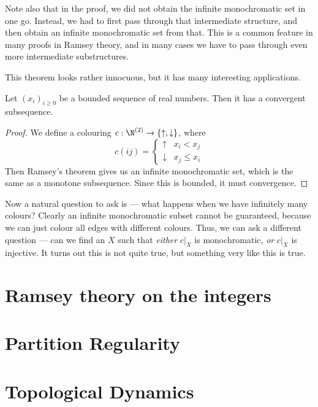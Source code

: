 \documentclass[a4paper]{article}
\begin{document}
Note also that in the proof, we did not obtain the infinite monochromatic set in one go. Instead, we had to first pass through that intermediate structure, and then obtain an infinite monochromatic set from that. This is a common feature in many proofs in Ramsey theory, and in many cases we have to pass through even more intermediate substructures.

This theorem looks rather innocuous, but it has many interesting applications.
\begin{cor}
  Let $(x_i)_{i \geq 0}$ be a bounded sequence of real numbers. Then it has a convergent subsequence.
\end{cor}

\begin{proof}
  We define a colouring $c: \N^{(2)} \to \{\uparrow, \downarrow\}$, where
  \[
    c(ij) =
    \begin{cases}
      \uparrow & x_i < x_j\\
      \downarrow & x_j \leq x_i
    \end{cases}
  \]
  Then Ramsey's theorem gives us an infinite monochromatic set, which is the same as a monotone subsequence. Since this is bounded, it must convergence.
\end{proof}

Now a natural question to ask is --- what happens when we have infinitely many colours? Clearly an infinite monochromatic subset cannot be guaranteed, because we can just colour all edges with different colours. Thus, we can ask a different question --- can we find an $X$ such that \emph{either} $c|_{X}$ is monochromatic, \emph{or} $c|_{X}$ is injective. It turns out this is not quite true, but something very like this is true.

\section{Ramsey theory on the integers}
\section{Partition Regularity}
\section{Topological Dynamics}

\printindex
\end{document}
